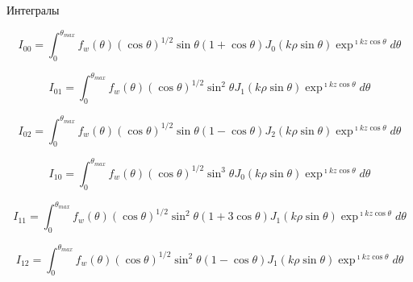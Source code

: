 \documentclass[9pt, compress, xcolor=table]{beamer}
\begin{document}
\begin{frame}{Интегралы}

\begin{equation*}
I_{00} = \int_{0}^{\theta_{max}} f_w (\theta) (\cos \theta)^{1/2} \sin \theta (1+ \cos \theta) J_0(k \rho \sin \theta)
\exp^{\imath k z \cos \theta} d \theta
\end{equation*}

\begin{equation*}
I_{01} = \int_{0}^{\theta_{max}} f_w (\theta) (\cos \theta)^{1/2} \sin^2 \theta J_1(k \rho \sin \theta)
\exp^{\imath k z \cos \theta} d \theta
\end{equation*}

\begin{equation*}
I_{02} = \int_{0}^{\theta_{max}} f_w (\theta) (\cos \theta)^{1/2} \sin \theta (1- \cos \theta) J_2(k \rho \sin \theta)
\exp^{\imath k z \cos \theta} d \theta
\end{equation*}

\begin{equation*}
I_{10} = \int_{0}^{\theta_{max}} f_w (\theta) (\cos \theta)^{1/2} \sin^3 \theta J_0(k \rho \sin \theta)
\exp^{\imath k z \cos \theta} d \theta
\end{equation*}

\begin{equation*}
I_{11} = \int_{0}^{\theta_{max}} f_w (\theta) (\cos \theta)^{1/2} \sin^2 \theta (1 + 3 \cos \theta) J_1(k \rho \sin \theta)
\exp^{\imath k z \cos \theta} d \theta
\end{equation*}

\begin{equation*}
I_{12} = \int_{0}^{\theta_{max}} f_w (\theta) (\cos \theta)^{1/2} \sin^2 \theta (1- \cos \theta) J_1(k \rho \sin \theta)
\exp^{\imath k z \cos \theta} d \theta
\end{equation*}

\end{frame}
\end{document}
